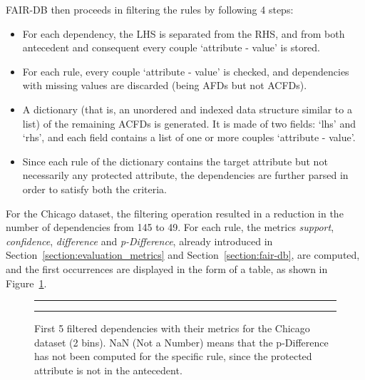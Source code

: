 \begin{itemize}
FAIR-DB then proceeds in filtering the rules by following 4 steps:
\begin{itemize}
\item[1.] For each dependency, the LHS is separated from the RHS, and from both antecedent and consequent every couple `attribute - value' is stored.
\item[2.] For each rule, every couple `attribute - value' is checked, and dependencies with missing values are discarded (being AFDs but not ACFDs).
\item[3.] A dictionary (that is, an unordered and indexed data structure similar to a list) of the remaining ACFDs is generated. It is made of two fields: `lhs' and `rhs', and each field contains a list of one or more couples `attribute - value'.
\item[4.] Since each rule of the dictionary contains the target attribute but not necessarily any protected attribute, the dependencies are further parsed in order to satisfy both the criteria.
\end{itemize}

For the Chicago dataset, the filtering operation resulted in a reduction in the number of dependencies from 145 to 49. For each rule, the metrics \textit{support}, \textit{confidence}, \textit{difference} and \textit{p-Difference}, already introduced in Section~\ref{section:evaluation_metrics} and Section~\ref{section:fair-db}, are computed, and the first occurrences are displayed in the form of a table, as shown in Figure~\ref{fig:chicago_fair-db2}.

\begin{figure}[t!]
\centering
\noindent\rule{\linewidth}{0.4pt}\par
\noindent\rule{\linewidth}{0.4pt}
\caption{First 5 filtered dependencies with their metrics for the Chicago dataset (2 bins). NaN (Not a Number) means that the p-Difference has not been computed for the specific rule, since the protected attribute is not in the antecedent.}
\label{fig:chicago_fair-db2}
\end{figure}


\end{itemize}
